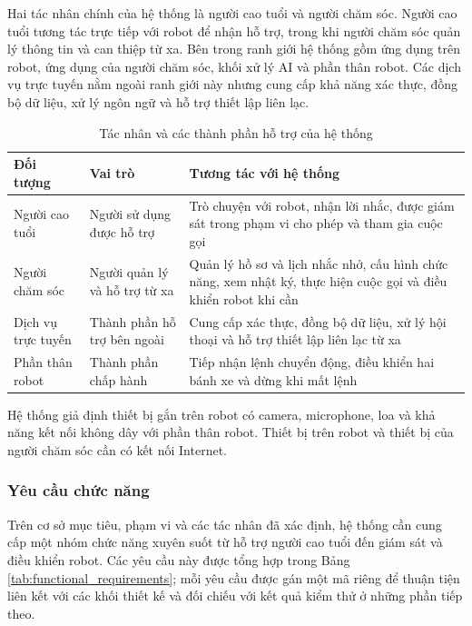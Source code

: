 Hai tác nhân chính của hệ thống là người cao tuổi và người chăm sóc. Người cao tuổi tương tác trực tiếp với robot để nhận hỗ trợ, trong khi người chăm sóc quản lý thông tin và can thiệp từ xa. Bên trong ranh giới hệ thống gồm ứng dụng trên robot, ứng dụng của người chăm sóc, khối xử lý AI và phần thân robot. Các dịch vụ trực tuyến nằm ngoài ranh giới này nhưng cung cấp khả năng xác thực, đồng bộ dữ liệu, xử lý ngôn ngữ và hỗ trợ thiết lập liên lạc.

\begin{table}[H]
\centering
\caption{Tác nhân và các thành phần hỗ trợ của hệ thống}
\label{tab:actors}
\small
\begin{tabularx}{\textwidth}{|p{3.0cm}|X|X|}
\hline
\textbf{Đối tượng} & \textbf{Vai trò} & \textbf{Tương tác với hệ thống} \\
\hline
Người cao tuổi & Người sử dụng được hỗ trợ & Trò chuyện với robot, nhận lời nhắc, được giám sát trong phạm vi cho phép và tham gia cuộc gọi \\
\hline
Người chăm sóc & Người quản lý và hỗ trợ từ xa & Quản lý hồ sơ và lịch nhắc nhở, cấu hình chức năng, xem nhật ký, thực hiện cuộc gọi và điều khiển robot khi cần \\
\hline
Dịch vụ trực tuyến & Thành phần hỗ trợ bên ngoài & Cung cấp xác thực, đồng bộ dữ liệu, xử lý hội thoại và hỗ trợ thiết lập liên lạc từ xa \\
\hline
Phần thân robot & Thành phần chấp hành & Tiếp nhận lệnh chuyển động, điều khiển hai bánh xe và dừng khi mất lệnh \\
\hline
\end{tabularx}
\end{table}

Hệ thống giả định thiết bị gắn trên robot có camera, microphone, loa và khả năng kết nối không dây với phần thân robot. Thiết bị trên robot và thiết bị của người chăm sóc cần có kết nối Internet.

\subsubsection{Yêu cầu chức năng}

Trên cơ sở mục tiêu, phạm vi và các tác nhân đã xác định, hệ thống cần cung cấp một nhóm chức năng xuyên suốt từ hỗ trợ người cao tuổi đến giám sát và điều khiển robot. Các yêu cầu này được tổng hợp trong Bảng \ref{tab:functional_requirements}; mỗi yêu cầu được gán một mã riêng để thuận tiện liên kết với các khối thiết kế và đối chiếu với kết quả kiểm thử ở những phần tiếp theo.

